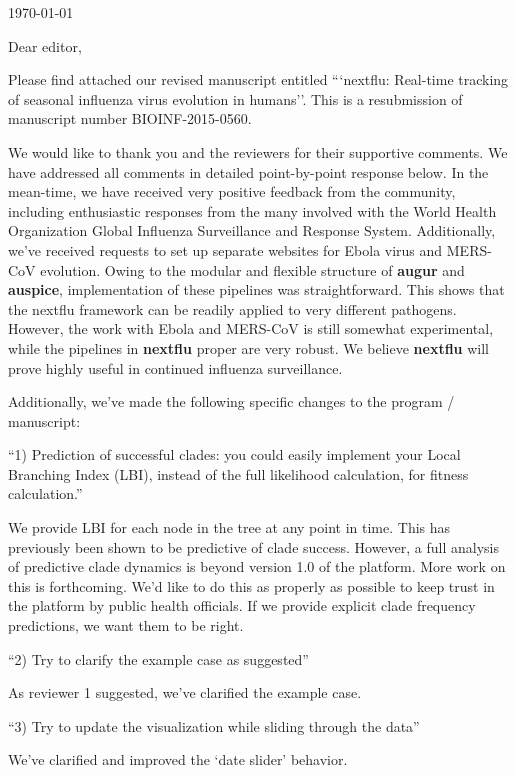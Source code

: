 \documentclass[11pt,oneside,letterpaper]{article}
\newcommand{\augur}{\textbf{augur}}
\newcommand{\auspice}{\textbf{auspice}}
\newcommand{\nextflu}{\textbf{nextflu}}
\begin{document}

\today

\vspace{1cm}

Dear editor,

Please find attached our revised manuscript entitled ```nextflu: Real-time tracking of seasonal influenza virus evolution in humans''.  This is a resubmission of manuscript number BIOINF-2015-0560.

We would like to thank you and the reviewers for their supportive comments. We have addressed all comments in detailed point-by-point response below. In the mean-time, we have received very positive feedback from the community, including enthusiastic responses from the many involved with the World Health Organization Global Influenza Surveillance and Response System. Additionally, we've received requests to set up separate websites for Ebola virus and MERS-CoV evolution. Owing to the modular and flexible structure of \augur{} and \auspice{}, implementation of these pipelines was straightforward. This shows that the nextflu framework can be readily applied to very different pathogens. However, the work with Ebola and MERS-CoV is still somewhat experimental, while the pipelines in \nextflu{} proper are very robust. We believe \nextflu{} will prove highly useful in continued influenza surveillance.

Additionally, we've made the following specific changes to the program / manuscript:

``1) Prediction of successful clades: you could easily implement your Local Branching Index (LBI), instead of the full likelihood calculation, for fitness calculation.''

We provide LBI for each node in the tree at any point in time. This has previously been shown to be predictive of clade success. However, a full analysis of predictive clade dynamics is beyond version 1.0 of the platform. More work on this is forthcoming. We'd like to do this as properly as possible to keep trust in the platform by public health officials. If we provide explicit clade frequency predictions, we want them to be right.

``2) Try to clarify the example case as suggested''

As reviewer 1 suggested, we've clarified the example case.

``3) Try to update the visualization while sliding through the data''

We've clarified and improved the `date slider' behavior.
\end{document}
